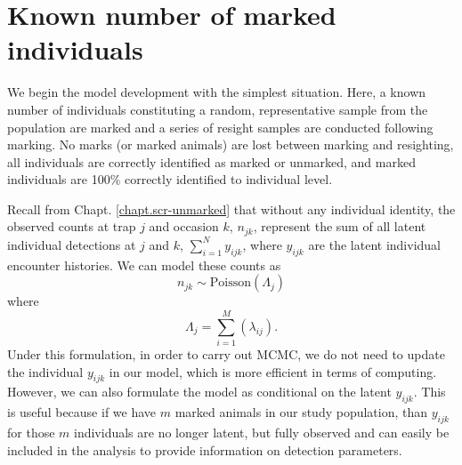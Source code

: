 \section{Known number of marked individuals}

We begin the model development with the simplest situation. Here, a known number of
individuals constituting a random, representative sample from the
population are marked and a series of resight samples are conducted
following marking. No marks (or marked animals) are lost between
marking and resighting, all individuals are correctly identified as
marked or unmarked, and marked individuals are 100\% correctly
identified to individual level.

Recall from Chapt. \ref{chapt.scr-unmarked} that without any individual identity, the observed counts at trap
$j$ and occasion $k$, $n_{jk}$, represent the sum of all latent
individual detections at $j$ and $k$,
$\displaystyle\sum\limits_{i=1}^{N} y_{ijk}$, where $y_{ijk}$ are the
latent individual encounter histories.
We can model these counts as
\[
n_{jk} \sim \mbox{Poisson}( \Lambda_{j} )
\]
where
\[
\Lambda_{j} = \sum_{i=1}^{M}( \lambda_{ij} ).
\]
Under this formulation, in order to carry out MCMC,
 we do not need to update the individual
$y_{ijk}$ in our model, which  is more efficient in terms of
computing. However, we can also formulate the model as conditional on
the latent $y_{ijk}$. This is useful because if we have $m$
marked animals in our study population, than $y_{ijk}$ for
those $m$ individuals are no longer latent, but fully observed and can easily be
included in the analysis to provide information on detection parameters.


